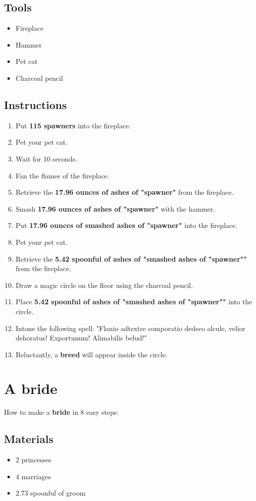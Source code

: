 \documentclass{article}
\begin{document}
\subsection{Tools}\begin{itemize}
\item 
Fireplace
\item 
Hammer
\item 
Pet cat
\item 
Charcoal pencil
\end{itemize}
\subsection{Instructions}\begin{enumerate}
\item 
Put \textbf{115 spawners} into the fireplace.
\item 
Pet your pet cat.
\item 
Wait for 10 seconds.
\item 
Fan the flames of the fireplace.
\item 
Retrieve the \textbf{17.96 ounces of ashes of "spawner"} from the fireplace.
\item 
Smash \textbf{17.96 ounces of ashes of "spawner"} with the hammer.
\item 
Put \textbf{17.96 ounces of smashed ashes of "spawner"} into the fireplace.
\item 
Pet your pet cat.
\item 
Retrieve the \textbf{5.42 spoonful of ashes of "smashed ashes of "spawner""} from the fireplace.
\item 
Draw a magic circle on the floor using the charcoal pencil.
\item 
Place \textbf{5.42 spoonful of ashes of "smashed ashes of "spawner""} into the circle.
\item 
Intone the following spell: "Flanio adtextre comporatio dedeco alcule, velior dehoratus! Exportunum! Alimabilis belud!"
\item 
Reluctantly, a \textbf{breed} will appear inside the circle.
\end{enumerate}
\newpage
\section{A bride}How to make a \textbf{bride} in 8 easy steps:

\subsection{Materials}\begin{itemize}
\item 
2 princesses
\item 
4 marriages
\item 
2.73 spoonful of groom
\end{itemize}
\end{document}
